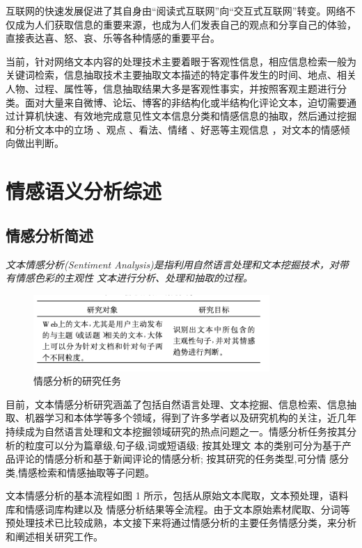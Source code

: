 \documentclass[hyperref,a4paper,UTF8]{ctexart}
\begin{document}
互联网的快速发展促进了其自身由“阅读式互联网”向“交互式互联网”转变。网络不仅成为人们获取信息的重要来源，也成为人们发表自己的观点和分享自己的体验，直接表达喜、怒、哀、乐等各种情感的重要平台。 


当前，针对网络文本内容的处理技术主要着眼于客观性信息，相应信息检索一般为关键词检索，信息抽取技术主要抽取文本描述的特定事件发生的时间、地点、相关人物、过程、属性等，信息抽取结果大多是客观性事实，并按照客观主题进行分类。面对大量来自微博、论坛、博客的非结构化或半结构化评论文本，迫切需要通过计算机快速、有效地完成意见性文本信息分类和情感信息的抽取，然后通过挖掘和分析文本中的立场 、观点 、看法、情绪 、好恶等主观信息 ，对文本的情感倾向做出判断。 \cite{DBLP:journals/ijon/MerchaB23}

\section{情感语义分析综述}

\subsection{情感分析简述}

\textit{文本情感分析(Sentiment Analysis)是指利用自然语言处理和文本挖掘技术，对带有情感色彩的主观性 文本进行分析、处理和抽取的过程。}

\begin{figure}[ht]
	\centering
	\includegraphics[width=0.8\textwidth]{fig/pic1.png}
	\caption{情感分析的研究任务}
    \label{fig:example}
\end{figure}

目前，文本情感分析研究涵盖了包括自然语言处理、文本挖掘、信息检索、信息抽取、机器学习和本体学等多个领域，得到了许多学者以及研究机构的关注，近几年持续成为自然语言处理和文本挖掘领域研究的热点问题之一。情感分析任务按其分析的粒度可以分为篇章级,句子级,词或短语级; 按其处理文 本的类别可分为基于产品评论的情感分析和基于新闻评论的情感分析; 按其研究的任务类型,可分情 感分类,情感检索和情感抽取等子问题。 \cite{DBLP:journals/ijon/MerchaB23}


文本情感分析的基本流程如图 1 所示，包括从原始文本爬取，文本预处理，语料库和情感词库构建以及 情感分析结果等全流程。由于文本原始素材爬取、分词等预处理技术已比较成熟，本文接下来将通过情感分析的主要任务情感分类，来分析和阐述相关研究工作。
\end{document}
